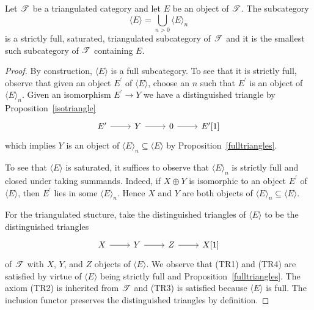 \documentclass[dissertation.tex]{subfiles}
\begin{document}
\begin{prop}
  Let $\mathscr{T}$ be a triangulated category and let $E$ be an object of $\mathscr{T}$.
  The subcategory
  $$\langle E \rangle = \bigcup_{n > 0} \langle E \rangle_n$$
  is a strictly full, saturated, triangulated subcategory of $\mathscr{T}$ and it is the smallest such subcategory of $\mathscr{T}$ containing $E$.

  \begin{proof}
    By construction, $\langle E \rangle$ is a full subcategory.
    To see that it is strictly full, observe that given an object $E^\prime$ of $\langle E \rangle$, choose an $n$ such that $E^\prime$ is an object of $\langle E \rangle_n$.
    Given an isomorphism $E^\prime \rightarrow Y$ we have a distinguished triangle by Proposition~\ref{isotriangle}
    $$\begin{tikzcd}
      E^\prime \arrow{r} & Y \arrow{r} & 0 \arrow{r} & E^\prime[1]
    \end{tikzcd}$$
    which implies $Y$ is an object of $\langle E \rangle_n \subseteq \langle E \rangle$ by Proposition~\ref{fulltriangles}.
    
    To see that $\langle E \rangle$ is saturated, it suffices to observe that $\langle E \rangle_n$ is strictly full and closed under taking summands.
    Indeed, if $X \oplus Y$ is isomorphic to an object $E^\prime$ of $\langle E \rangle$, then $E^\prime$ lies in some $\langle E \rangle_n$.
    Hence $X$ and $Y$ are both objects of $\langle E \rangle_n \subseteq \langle E \rangle$.
    
    For the triangulated stucture, take the distinguished triangles of $\langle E \rangle$ to be the distinguished triangles 
    $$\begin{tikzcd}
      X \arrow{r} & Y \arrow{r} & Z \arrow{r} & X[1]
    \end{tikzcd}$$
    of $\mathscr{T}$ with $X$, $Y$, and $Z$ objects of $\langle E \rangle$.
    We observe that (TR1) and (TR4) are satisfied by virtue of $\langle E \rangle$ being strictly full and Proposition~\ref{fulltriangles}.
    The axiom (TR2) is inherited from $\mathscr{T}$ and (TR3) is satisfied because $\langle E \rangle$ is full.
    The inclusion functor preserves the distinguished triangles by definition.


\end{proof}
\end{prop}
\end{document}
